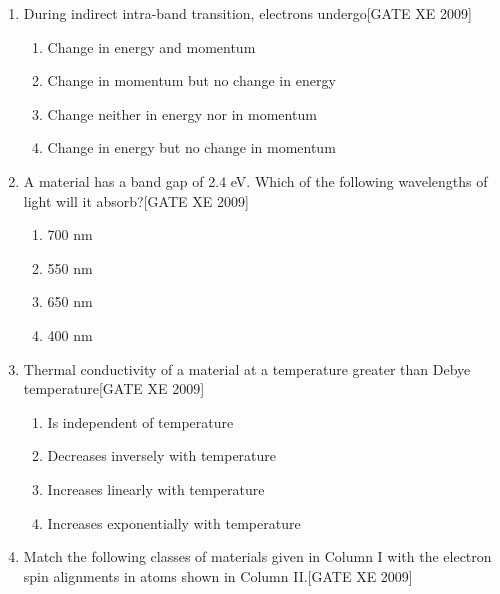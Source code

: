 \documentclass[journal,12pt,onecolumn]{IEEEtran}
\theoremstyle{remark}
\begin{document}
\begin{enumerate}
\item During indirect intra-band transition, electrons undergo\hfill[GATE XE 2009]

\begin{multicols}{2}
\begin{enumerate}
    \item Change in energy and momentum
    \item Change in momentum but no change in energy
    \item Change neither in energy nor in momentum
    \item Change in energy but no change in momentum
\end{enumerate}
\end{multicols}



\item A material has a band gap of 2.4 eV. Which of the following wavelengths of light will it absorb?\hfill[GATE XE 2009]

\begin{multicols}{2}
\begin{enumerate}
    \item 700 nm
    \item 550 nm
    \item 650 nm
    \item 400 nm
\end{enumerate}
\end{multicols}



\item Thermal conductivity of a material at a temperature greater than Debye temperature\hfill[GATE XE 2009]

\begin{multicols}{2}
\begin{enumerate}
    \item Is independent of temperature
    \item Decreases inversely with temperature
    \item Increases linearly with temperature
    \item Increases exponentially with temperature
\end{enumerate}
\end{multicols}






\item  Match the following classes of materials given in Column I with the electron spin alignments in atoms shown in Column II.\hfill[GATE XE 2009]




\end{enumerate}
\end{document}
